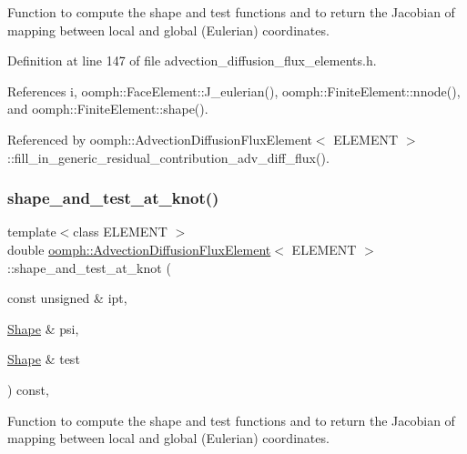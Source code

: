 Function to compute the shape and test functions and to return the Jacobian of mapping between local and global (Eulerian) coordinates. 



Definition at line 147 of file advection\+\_\+diffusion\+\_\+flux\+\_\+elements.\+h.



References i, oomph\+::\+Face\+Element\+::\+J\+\_\+eulerian(), oomph\+::\+Finite\+Element\+::nnode(), and oomph\+::\+Finite\+Element\+::shape().



Referenced by oomph\+::\+Advection\+Diffusion\+Flux\+Element$<$ E\+L\+E\+M\+E\+N\+T $>$\+::fill\+\_\+in\+\_\+generic\+\_\+residual\+\_\+contribution\+\_\+adv\+\_\+diff\+\_\+flux().

\mbox{\label{classoomph_1_1AdvectionDiffusionFluxElement_a32af9be97192954538f40cba54facd83}} 
\subsubsection{\texorpdfstring{shape\+\_\+and\+\_\+test\+\_\+at\+\_\+knot()}{shape\_and\_test\_at\_knot()}}
{\footnotesize\ttfamily template$<$class E\+L\+E\+M\+E\+NT $>$ \\
double \hyperlink{classoomph_1_1AdvectionDiffusionFluxElement}{oomph\+::\+Advection\+Diffusion\+Flux\+Element}$<$ E\+L\+E\+M\+E\+NT $>$\+::shape\+\_\+and\+\_\+test\+\_\+at\+\_\+knot (\begin{DoxyParamCaption}\item[{const unsigned \&}]{ipt,  }\item[{\hyperlink{classoomph_1_1Shape}{Shape} \&}]{psi,  }\item[{\hyperlink{classoomph_1_1Shape}{Shape} \&}]{test }\end{DoxyParamCaption}) const\hspace{0.3cm}{\ttfamily [inline]}, {\ttfamily [protected]}}



Function to compute the shape and test functions and to return the Jacobian of mapping between local and global (Eulerian) coordinates. 



